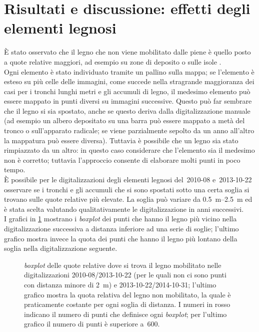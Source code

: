 \section{Risultati e discussione: effetti degli elementi legnosi}
È stato osservato che il legno che non viene mobilitato dalle piene è quello posto a quote relative maggiori, ad esempio su zone di deposito o sulle isole .
\\
Ogni elemento è stato individuato tramite un pallino sulla mappa; se l'elemento è esteso su più celle delle immagini, come succede nella stragrande maggioranza dei casi per i tronchi lunghi metri e gli accumuli di legno, il medesimo elemento può essere mappato in punti diversi su immagini successive.
Questo può far sembrare che il legno si sia spostato, anche se questo deriva dalla digitalizzazione manuale (ad esempio un albero depositato su una barra può essere mappato a metà del tronco o sull'apparato radicale; se viene parzialmente sepolto da un anno all'altro la mappatura può essere diversa).
Tuttavia è possibile che un legno sia stato rimpiazzato da un altro: in questo caso considerare che l'elemento sia il medesimo non è corretto; tuttavia l'approccio consente di elaborare molti punti in poco tempo.
\\
È possibile per le digitalizzazioni degli elementi legnosi del~2010-08 e~2013-10-22 osservare se i tronchi e gli accumuli che si sono spostati sotto una certa soglia si trovano sulle quote relative più elevate.
La soglia può variare da \SIrange[range-phrase = { a }]{0.5}{2.5}{\m} ed è stata scelta valutando qualitativamente le digitalizzazione in anni successivi.
\\
I grafici in \cref{graph:elementi-dem-detrended-distanza} mostrano i \emph{boxplot} dei punti che hanno il legno più vicino nella digitalizzazione successiva a distanza inferiore ad una serie di soglie; l'ultimo grafico mostra invece la quota dei punti che hanno il legno più lontano della soglia nella digitalizzazione seguente.
%
\begin{figure}
	\centering
	
	\caption[\emph{boxplot} delle quote relative dove si trova il legno mobilitato]{\emph{boxplot} delle quote relative dove si trova il legno mobilitato nelle digitalizzazioni 2010-08/2013-10-22 (per le quali non ci sono punti con distanza minore di \SI{2}{\m}) e 2013-10-22/2014-10-31; l'ultimo grafico mostra la quota relativa del legno non mobilitato, la quale è praticamente costante per ogni soglia di distanza.
	I numeri in rosso indicano il numero di punti che definisce ogni \emph{boxplot}; per l'ultimo grafico il numero di punti è superiore a~\num{600}.}
	\label{graph:elementi-dem-detrended-distanza}
\end{figure}
%

